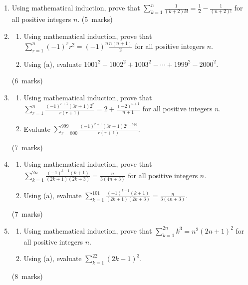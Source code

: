 \documentclass[12pt, a4paper]{article} %
\newcommand{\qmarks}[1]{\leavevmode\unskip\hspace*{\fill}\mbox{(#1 marks)}}
\begin{document}
\begin{enumerate}
    \item Using mathematical induction, prove that \(\displaystyle \sum_{k=1}^n\frac{1}{(k+2)k!}=\frac{1}{2}-\frac{1}{(n+2)!}\) for all positive integers \(n\). \qmarks{5}
    
    \item \begin{enumerate}
        \item Using mathematical induction, prove that \(\displaystyle \sum_{r=1}^n(-1)^rr^2=(-1)^n\frac{n(n+1)}{2}\) for all positive integers \(n\).
        \item Using (a), evaluate \(1001^2-1002^2+1003^2-\cdots+1999^2-2000^2\).
    \end{enumerate}\qmarks{6}

    \item \begin{enumerate}
        \item Using mathematical induction, prove that \(\displaystyle \sum_{r=1}^n\frac{(-1)^{r+1}(3r+1)2^r}{r(r+1)}=2+\frac{(-2)^{n+1}}{n+1}\) for all positive integers \(n\).
        \item Evaluate \(\displaystyle \sum_{r=800}^{999}\frac{(-1)^{r+1}(3r+1)2^{r-799}}{r(r+1)}\).
    \end{enumerate}\qmarks{7}

    \item \begin{enumerate}
        \item Using mathematical induction, prove that \(\displaystyle \sum_{k=1}^{2n}\frac{(-1)^{k-1}(k+1)}{(2k+1)(2k+3)}=\frac{n}{3(4n+3)}\) for all positive integers \(n\).
        \item Using (a), evaluate \(\displaystyle \sum_{k=1}^{101}\frac{(-1)^{k-1}(k+1)}{(2k+1)(2k+3)}=\frac{n}{3(4n+3)}\).
    \end{enumerate}\qmarks{7}

    \item \begin{enumerate}
        \item Using mathematical induction, prove that \(\displaystyle \sum_{k=1}^{2n}k^3=n^2(2n+1)^2\) for all positive integers \(n\).
        \item Using (a), evaluate \(\displaystyle \sum_{k=1}^{22}(2k-1)^3\).
    \end{enumerate}\qmarks{8}
    
\end{enumerate}
\end{document}
